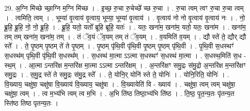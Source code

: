 \documentclass[17pt]{extarticle}
\begin{document}
29. अ॒ग्नि मि॑च्छे च्छा॒ग्नि म॒ग्नि मि॑च्छ । . इ॒च्छ॒ रु॒चा रु॒चेच्छे᳚ च्छ रु॒चा । . रु॒चा त्वम् त्वꣳ रु॒चा रु॒चा त्वम् । . त्वमिति॒ त्वम् । . भूम्या॑ वृ॒त्वाय॑ वृ॒त्वाय॒ भूम्या॒ भूम्या॑ वृ॒त्वाय॑ । . वृ॒त्वाय॑ नो नो वृ॒त्वाय॑ वृ॒त्वाय॑ नः । . नो॒ ब्रू॒हि॒ ब्रू॒हि॒ नो॒ नो॒ ब्रू॒हि॒ । . ब्रू॒हि॒ यतो॒ यतो᳚ ब्रूहि ब्रूहि॒ यतः॑ । . यतः॒ खना॑म॒ खना॑म॒ यतो॒ यतः॒ खना॑म । . खना॑म॒ तम् तम् खना॑म॒ खना॑म॒ तम् । . तं ॅव॒यं ॅव॒यम् तम् तं ॅव॒यम् । . व॒यमिति॑ व॒यम् । . द्यौ स्ते॑ ते॒ द्यौर् द्यौ स्ते᳚ । . ते॒ पृ॒ष्ठम् पृ॒ष्ठम् ते॑ ते पृ॒ष्ठम् । . पृ॒ष्ठम् पृ॑थि॒वी पृ॑थि॒वी पृ॒ष्ठम् पृ॒ष्ठम् पृ॑थि॒वी । . पृ॒थि॒वी स॒धस्थꣳ॑ स॒धस्थ॑म् पृथि॒वी पृ॑थि॒वी स॒धस्थ᳚म् । . स॒धस्थ॑ मा॒त्मा ऽऽत्मा स॒धस्थꣳ॑ स॒धस्थ॑ मा॒त्मा । . स॒धस्थ॒मिति॑ स॒ध - स्थ॒म् । . आ॒त्मा ऽन्तरि॑क्ष म॒न्तरि॑क्ष मा॒त्मा ऽऽत्मा ऽन्तरि॑क्षम् । . अ॒न्तरि॑क्षꣳ समु॒द्रः स॑मु॒द्रो अ॒न्तरि॑क्ष म॒न्तरि॑क्षꣳ समु॒द्रः । . स॒मु॒द्र स्ते॑ ते समु॒द्रः स॑मु॒द्र स्ते᳚ । . ते॒ योनि॒र् योनि॑ स्ते ते॒ योनिः॑ । . योनि॒रिति॒ योनिः॑ । . वि॒ख्याय॒ चक्षु॑षा॒ चक्षु॑षा वि॒ख्याय॑ वि॒ख्याय॒ चक्षु॑षा । . वि॒ख्यायेति॑ वि - ख्याय॑ । . चक्षु॑षा॒ त्वम् त्वम् चक्षु॑षा॒ चक्षु॑षा॒ त्वम् । . त्व म॒भ्य॑भि त्वम् त्व म॒भि । . अ॒भि ति॑ष्ठ तिष्ठा॒भ्य॑भि ति॑ष्ठ । . ति॒ष्ठ॒ पृ॒त॒न्य॒तः पृ॑तन्य॒त स्ति॑ष्ठ तिष्ठ पृतन्य॒तः । \newline
\end{document}

